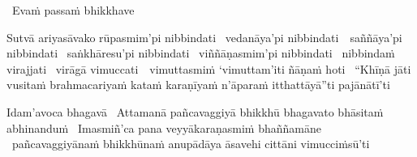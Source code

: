\begin{pali-leader}
  \anglebracketleft\ \hspace{-0.5mm}Evaṁ passaṁ bhikkhave \hspace{-0.5mm}\anglebracketright\
\end{pali-leader}
\begin{pali-hangtogether}
  Sutvā ariyasāvako rūpasmim'pi nibbindati \breathmark\ vedanāya'pi \mbox{nibbindati}~\breathmark\ saññāya'pi nibbindati \breathmark\ saṅkhāresu'pi nibbindati \breathmark\ viññāṇasmim'pi nibbindati \breathmark\ nibbindaṁ virajjati \breathmark\ virāgā \mbox{vimuccati}~\breathmark\ vimuttasmiṁ `vimuttam'iti ñāṇaṁ hoti \breathmark\ ``Khīṇā jāti vusitaṁ brahmacariyaṁ kataṁ karaṇīyaṁ n'āparaṁ itthattāyā''ti pajānātī'ti
\end{pali-hangtogether}

\clearpage

\begin{pali-hang}
  Idam'avoca bhagavā \breathmark\ Attamanā pañcavaggiyā bhikkhū bhagavato bhāsitaṁ abhinanduṁ \breathmark\ Imasmiñ'ca pana veyyākaraṇasmiṁ bhaññamāne \breathmark\ pañcavaggiyānaṁ bhikkhūnaṁ anupādāya āsavehi cittāni vimucciṁsū'ti
\end{pali-hang}

\suttaRef{[SN 22.59]}

